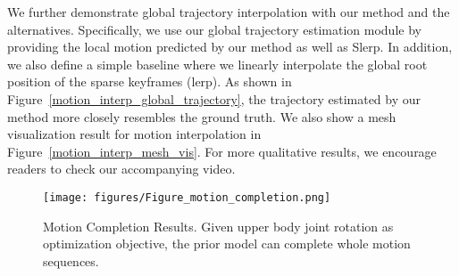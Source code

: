 We further demonstrate global trajectory interpolation with our method and the alternatives.
Specifically, we use our global trajectory estimation module by providing the local motion predicted by our method as well as Slerp. In addition, we also define a simple baseline where we linearly interpolate the global root position of the sparse keyframes (lerp).  As shown in Figure~\ref{motion_interp_global_trajectory}, the trajectory estimated by our method more closely resembles the ground truth.      
We also show a mesh visualization result for motion interpolation in Figure~\ref{motion_interp_mesh_vis}. For more qualitative results, we encourage readers to check our accompanying video.   






\begin{figure*}[h]
\begin{center}
\vspace{-5mm}
\texttt{[image: figures/Figure\_motion\_completion.png]}
\end{center}
\vspace{-6mm}
\caption{Motion Completion Results. Given upper body joint rotation as optimization objective, the prior model can complete whole motion sequences.}
\label{motion_completion}
\vspace{-6mm}
\end{figure*}




